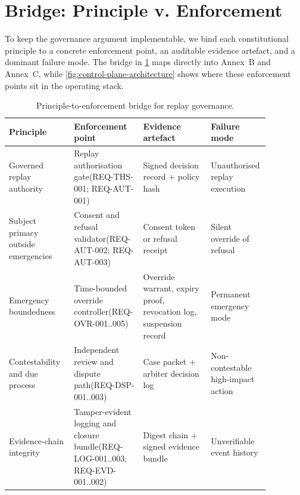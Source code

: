 \documentclass[11pt]{article}
\theoremstyle{definition}
\theoremstyle{plain}
\theoremstyle{remark}
\begin{document}
\section{Bridge: Principle v. Enforcement}
\label{sec:bridge}

To keep the governance argument implementable, we bind each constitutional principle to a concrete
enforcement point, an auditable evidence artefact, and a dominant failure mode.
The bridge in \cref{tbl:principle-enforcement-bridge} maps directly into Annex~B and Annex~C, while
\cref{fig:control-plane-architecture} shows where these enforcement points sit in the operating stack.

\begin{table}[htbp]
\centering
\scriptsize
\setlength{\tabcolsep}{6pt}
\renewcommand{\arraystretch}{1.22}
\begin{tabularx}{0.985\linewidth}{p{0.24\linewidth} p{0.20\linewidth} p{0.25\linewidth} p{0.18\linewidth}}
\rowcolor{tableheadgray}
\hline
\textbf{Principle} & \textbf{Enforcement point} & \textbf{Evidence artefact} & \textbf{Failure mode} \\
\hline
\rowcolor{tablerowgray}
Governed replay authority & Replay authorisation gate\newline (REQ-THS-001; REQ-AUT-001) & Signed decision record + policy hash & Unauthorised replay execution \\
Subject primacy outside emergencies & Consent and refusal validator\newline (REQ-AUT-002; REQ-AUT-003) & Consent token or refusal receipt & Silent override of refusal \\
\rowcolor{tablerowgray}
Emergency boundedness & Time-bounded override controller\newline (REQ-OVR-001..005) & Override warrant, expiry proof, revocation log, suspension record & Permanent emergency mode \\
Contestability and due process & Independent review and dispute path\newline (REQ-DSP-001..003) & Case packet + arbiter decision log & Non-contestable high-impact action \\
\rowcolor{tablerowgray}
Evidence-chain integrity & Tamper-evident logging and closure bundle\newline (REQ-LOG-001..003; REQ-EVD-001..002) & Digest chain + signed evidence bundle & Unverifiable event history \\
\hline
\end{tabularx}
\caption{Principle-to-enforcement bridge for replay governance.}
\label{tbl:principle-enforcement-bridge}
\end{table}
\end{document}
